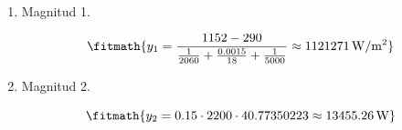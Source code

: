 \begin{enumerate}

\item Magnitud 1.

\[\fitmath{y_{1}=\frac{1152-290}{\frac{1}{2060}+\frac{0.0015}{18}+\frac{1}{5000}}\approx 1121271\,\mathrm{W/m^{2}}}\]

\item Magnitud 2.

\[\fitmath{y_{2}=0.15\cdot 2200\cdot 40.77350223\approx 13455.26\,\mathrm{W}}\]

\end{enumerate}
